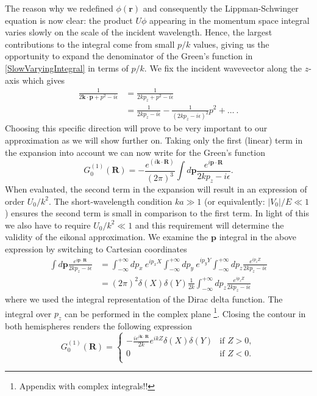 \documentclass[11pt]{article}
\numberwithin{equation}{section}
\begin{document}
 The reason why we redefined $\phi(\mathbf{r})$ and consequently the Lippman-Schwinger equation is now clear: the product $U\phi$ appearing in the momentum space integral varies slowly on the scale of the incident wavelength. Hence, the largest contributions to the integral come from small $p/k$ values, giving us the opportunity to expand the denominator of the Green's function in \eqref{SlowVaryingIntegral} in terms of $p/k$. We fix the incident wavevector along the $z$-axis which gives
 \begin{align}
 	\frac{1}{2 \mathbf{k}\cdot \mathbf{p} + p^2 - i\epsilon} &= \frac{1}{2 k p_z + p^2 - i\epsilon}\\
 	&= \frac{1}{2 k p_z  - i\epsilon} - \frac{1}{(2 k p_z - i\epsilon)^2}p^2 + \ldots ~.
 \end{align}
 Choosing this specific direction will prove to be very important to our approximation as we will show further on.
 Taking only the first (linear) term in the expansion into account we can now write for the Green's function
 \begin{equation}
	G^{(1)}_0(\mathbf{R}) = -\frac{e^{(i\mathbf{k}\cdot \mathbf{R})}}{(2\pi)^3} \int d \mathbf{p} \frac{e^{i\mathbf{p}\cdot \mathbf{R}}}{2k p_z - i\epsilon}.
 \end{equation}
When evaluated, the second term in the expansion will result in an expression of order $U_0/k^2$. The short-wavelength condition $ka \gg 1$ (or equivalently: $|V_0|/E \ll 1$) ensures the second term is small in comparison to the first term. In light of this we also have to require $U_0/k^2 \ll 1$ and this requirement will determine the validity of the eikonal approximation.
  We examine the $\mathbf{p}$ integral in the above expression by switching to Cartesian coordinates
 \begin{align}
 	\int d \mathbf{p} \frac{e^{i\mathbf{p}\cdot \mathbf{R}}}{2k p_z - i\epsilon} &= \int^{+ \infty}_{- \infty} dp_x ~e^{ip_x X}\int^{+ \infty}_{- \infty} dp_y ~e^{ip_y Y}\int^{+ \infty}_{- \infty} dp_z \frac{e^{ip_z Z}}{2k p_z - i\epsilon}\\
 	& = (2\pi)^2 \delta(X) \delta(Y) \frac{1}{2k} \int^{+ \infty}_{- \infty}dp_z \frac{e^{ip_z Z}}{2k p_z - i\epsilon}
 \end{align}
 where we used the integral representation of the Dirac delta function. The integral over $p_z$ can be performed in the complex plane \footnote{Appendix with complex integrals!!}. Closing the contour in both hemispheres renders the following expression
 \begin{equation}
 	G^{(1)}_0(\mathbf{R}) = 
 	\begin{cases}
 		- \frac{ie^{i\mathbf{k}\cdot \mathbf{R}}}{2k}e^{ikZ}\delta(X)\delta(Y) & \text{if } Z > 0,\\
 		0 &\text{if } Z < 0.\\
 		\end{cases}
\end{equation}
\end{document}

